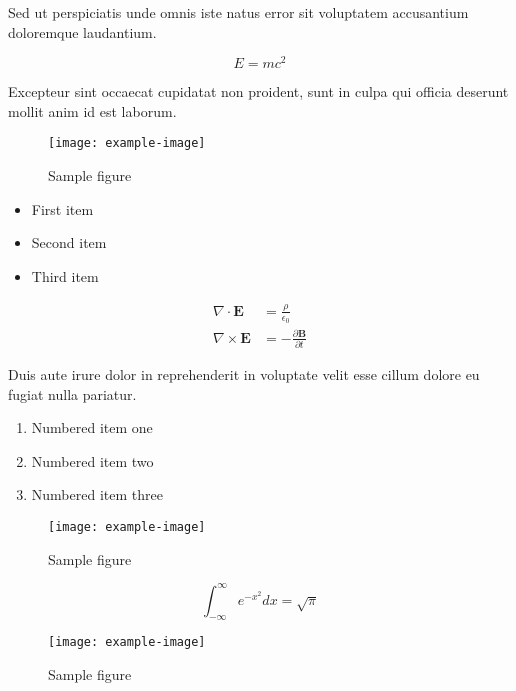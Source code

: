 \documentclass{article}
\begin{document}
Sed ut perspiciatis unde omnis iste natus error sit voluptatem accusantium doloremque laudantium.

\begin{equation}
    E = mc^2
\end{equation}

Excepteur sint occaecat cupidatat non proident, sunt in culpa qui officia deserunt mollit anim id est laborum.

\begin{figure}[h]
    \centering
    \texttt{[image: example-image]}
    \caption{Sample figure}
    \label{fig:sample}
\end{figure}


\begin{itemize}
\item First item
\item Second item
\item Third item
\end{itemize}

\begin{align}
    \nabla \cdot \mathbf{E} &= \frac{\rho}{\epsilon_0} \\
    \nabla \times \mathbf{E} &= -\frac{\partial \mathbf{B}}{\partial t}
\end{align}


Duis aute irure dolor in reprehenderit in voluptate velit esse cillum dolore eu fugiat nulla pariatur.

\begin{enumerate}
\item Numbered item one
\item Numbered item two
\item Numbered item three
\end{enumerate}

\begin{figure}[h]
    \centering
    \texttt{[image: example-image]}
    \caption{Sample figure}
    \label{fig:sample}
\end{figure}

\begin{equation}
    \int_{-\infty}^{\infty} e^{-x^2} dx = \sqrt{\pi}
\end{equation}

\begin{figure}[h]
    \centering
    \texttt{[image: example-image]}
    \caption{Sample figure}
    \label{fig:sample}
\end{figure}
\end{document}
